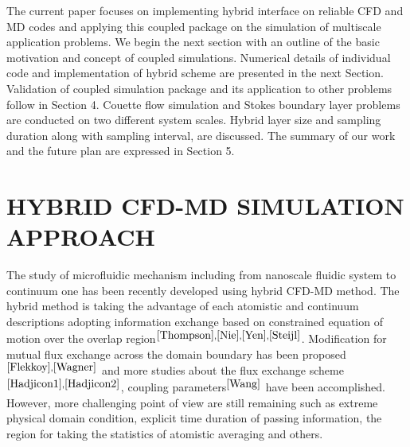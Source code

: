\documentclass{CFD2010paper}
\begin{document}
The current paper focuses on implementing hybrid interface on reliable CFD and MD codes and applying this coupled package on the simulation of multiscale application problems. We begin the next section with an outline of the basic motivation and concept of coupled simulations. Numerical details of individual code and implementation of hybrid scheme are presented in the next Section. Validation of coupled simulation package and its application to other problems follow in Section 4. Couette flow simulation and Stokes boundary layer problems are conducted on two different system scales. Hybrid layer size and sampling duration along with sampling interval, are discussed. The summary of our work and the future plan are expressed in Section 5.



\section{HYBRID CFD-MD SIMULATION APPROACH}

The study of microfluidic mechanism including from nanoscale fluidic system to continuum one has been recently developed using hybrid CFD-MD method. The hybrid method is taking the advantage of each atomistic and continuum descriptions adopting information exchange based on constrained equation of motion over the overlap region$^{\cite{Thompson},\cite{Nie},\cite{Yen},\cite{Steijl}}$. Modification for mutual flux exchange across the domain boundary has been proposed$^{\cite{Flekkoy},\cite{Wagner}}$ and more studies about the flux exchange scheme$^{\cite{Hadjicon1},\cite{Hadjicon2}}$, coupling parameters$^{\cite{Wang}}$ have been accomplished. However, more challenging point of view are still remaining such as extreme physical domain condition, explicit time duration of passing information, the region for taking the statistics of atomistic averaging and others.
\end{document}
